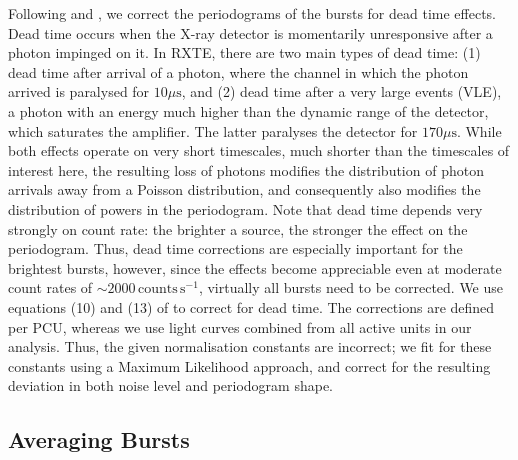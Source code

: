 \documentclass[numberedappendix]{emulateapj}
\begin{document}
Following \citet{zhang1995} and \citet{jahoda2006}, we correct the periodograms of the bursts for dead time effects. Dead time occurs when the X-ray detector is momentarily unresponsive after a photon impinged on it. In RXTE, there are two main types of dead time: (1) dead time after arrival of a photon, where the channel in which the photon arrived is paralysed for $10\mu\mathrm{s}$, and (2) dead time after a very large events (VLE), a photon with an energy much higher than the dynamic range of the detector, which saturates the amplifier. The latter paralyses the detector for $170\mu\mathrm{s}$. While both effects operate on very short timescales, much shorter than the timescales of interest here, the resulting loss of photons modifies the distribution of photon arrivals away from a Poisson distribution, and consequently also modifies the distribution of powers in the periodogram. Note that dead time depends very strongly on count rate: the brighter a source, the stronger the effect on the periodogram. Thus, dead time corrections are especially important for the brightest bursts, however, since the effects become appreciable even at moderate count rates of $\sim 2000 \,\mathrm{counts}\,\mathrm{s}^{-1}$, virtually all bursts need to be corrected. We use equations (10) and (13) of \citet{jahoda2006} to correct for dead time. The corrections are defined per PCU, whereas we use light curves combined from all active units in our analysis. Thus, the given normalisation constants are incorrect; we fit for these constants using a Maximum Likelihood approach, and correct for the resulting deviation in both noise level and periodogram shape. 

\subsection{Averaging Bursts}
\end{document}
